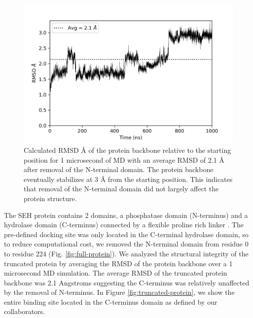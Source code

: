 \begin{figure}
    \centering
    \includegraphics[width=\linewidth]{chapter6/Figures/protein-bb-rmsd.png}
    \caption[SEH Backbone RMSD after N-terminal domain removal]{Calculated RMSD {\AA} of the protein backbone relative to the starting position for 1 microsecond of MD with an average RMSD of 2.1 {\AA} after removal of the N-terminal domain. The protein backbone eventually stabilizes at 3 {\AA} from the starting position. This indicates that removal of the N-terminal domain did not largely affect the protein structure.}
    \label{fig:protein-bb-rmsd}
\end{figure}

The SEH protein contains 2 domains, a phosphatase domain (N-terminus) and a hydrolase domain (C-terminus) connected by a flexible proline rich linker \cite{doi:10.1021/bi050842g}.
The pre-defined docking site was only located in the C-terminal hydrolase domain, so to reduce computational cost, we removed the N-terminal domain from residue 0 to residue 224 (Fig. \ref{fig:full-protein}).
We analyzed the structural integrity of the truncated protein by averaging the RMSD of the protein backbone over a 1 microsecond MD simulation.
The average RMSD of the truncated protein backbone was 2.1 Angstroms suggesting the C-terminus was relatively unaffected by the removal of N-terminus.
In Figure \ref{fig:truncated-protein}, we show the entire binding site located in the C-terminus domain as defined by our collaborators.

